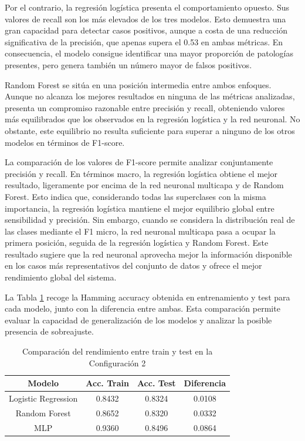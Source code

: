 \documentclass[12pt,a4paper,twoside]{book}
\begin{document}
Por el contrario, la regresión logística presenta el comportamiento opuesto. Sus valores de recall son los más elevados de los tres modelos. 
Esto demuestra una gran capacidad para detectar casos positivos, aunque a costa de una reducción significativa de la precisión, que apenas supera el 0.53 en ambas métricas. 
En consecuencia, el modelo consigue identificar una mayor proporción de patologías presentes, pero genera también un número mayor de falsos positivos.

Random Forest se sitúa en una posición intermedia entre ambos enfoques. 
Aunque no alcanza los mejores resultados en ninguna de las métricas analizadas, presenta un compromiso razonable entre precisión y recall, obteniendo valores más equilibrados que los observados en la regresión logística y la red neuronal. 
No obstante, este equilibrio no resulta suficiente para superar a ninguno de los otros modelos en términos de F1-score.

La comparación de los valores de F1-score permite analizar conjuntamente precisión y recall. 
En términos macro, la regresión logística obtiene el mejor resultado, ligeramente por encima de la red neuronal multicapa y de Random Forest.
Esto indica que, considerando todas las superclases con la misma importancia, la regresión logística mantiene el mejor equilibrio global entre sensibilidad y precisión. 
Sin embargo, cuando se considera la distribución real de las clases mediante el F1 micro, la red neuronal multicapa pasa a ocupar la primera posición, seguida de la regresión logística y Random Forest. 
Este resultado sugiere que la red neuronal aprovecha mejor la información disponible en los casos más representativos del conjunto de datos y ofrece el mejor rendimiento global del sistema.

La Tabla \ref{tab:config2_gap} recoge la Hamming accuracy obtenida en entrenamiento y test para cada modelo, junto con la diferencia entre ambas. Esta comparación permite evaluar la capacidad de generalización de los modelos y analizar la posible presencia de sobreajuste.

\begin{table}[H]
	\centering
	\begin{tabular}{|c|c|c|c|}
	\hline
	\textbf{Modelo} & \textbf{Acc. Train} & \textbf{Acc. Test} & \textbf{Diferencia} \\
	\hline
	Logistic Regression & 0.8432 & 0.8324 & 0.0108 \\
	Random Forest       & 0.8652 & 0.8320 & 0.0332 \\
	MLP                 & 0.9360 & 0.8496 & 0.0864 \\
	\hline
	\end{tabular}
	\caption{Comparación del rendimiento entre train y test en la Configuración 2}
	\label{tab:config2_gap}
\end{table}
\end{document}
